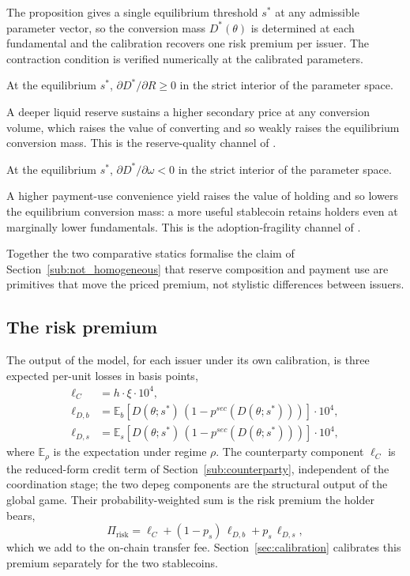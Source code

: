 The proposition gives a single equilibrium threshold $s^*$ at any admissible parameter vector, so the conversion mass $D^*(\theta)$ is determined at each fundamental and the calibration recovers one risk premium per issuer. The contraction condition is verified numerically at the calibrated parameters.

\begin{proposition}\label{prop:reserves}
At the equilibrium $s^*$, $\partial D^*/\partial R \geq 0$ in the strict interior of the parameter space.
\end{proposition}

A deeper liquid reserve sustains a higher secondary price at any conversion volume, which raises the value of converting and so weakly raises the equilibrium conversion mass. This is the reserve-quality channel of \citet{ma_zeng_zhang_2025}.

\begin{proposition}\label{prop:convenience}
At the equilibrium $s^*$, $\partial D^*/\partial \omega < 0$ in the strict interior of the parameter space.
\end{proposition}

A higher payment-use convenience yield raises the value of holding and so lowers the equilibrium conversion mass: a more useful stablecoin retains holders even at marginally lower fundamentals. This is the adoption-fragility channel of \citet{bertsch_2025_adoption_fragility}.

Together the two comparative statics formalise the claim of Section~\ref{sub:not_homogeneous} that reserve composition and payment use are primitives that move the priced premium, not stylistic differences between issuers.

\subsection{The risk premium}\label{sub:what_it_delivers}

The output of the model, for each issuer under its own calibration, is three expected per-unit losses in basis points,
\begin{align}
\ell_C &= h \cdot \xi \cdot 10^4,\label{eq:ellC} \\
\ell_{D,b} &= \mathbb{E}_b\!\left[D(\theta; s^*)\,(1 - p^{sec}(D(\theta; s^*)))\right] \cdot 10^4,\label{eq:ellDb} \\
\ell_{D,s} &= \mathbb{E}_s\!\left[D(\theta; s^*)\,(1 - p^{sec}(D(\theta; s^*)))\right] \cdot 10^4,\label{eq:ellDs}
\end{align}
where $\mathbb{E}_\rho$ is the expectation under regime $\rho$. The counterparty component $\ell_C$ is the reduced-form credit term of Section~\ref{sub:counterparty}, independent of the coordination stage; the two depeg components are the structural output of the global game. Their probability-weighted sum is the risk premium the holder bears,
\begin{equation}\label{eq:total_risk_premium}
\Pi_{\text{risk}} = \ell_C + (1-p_s)\,\ell_{D,b} + p_s\,\ell_{D,s},
\end{equation}
which we add to the on-chain transfer fee. Section~\ref{sec:calibration} calibrates this premium separately for the two stablecoins.
